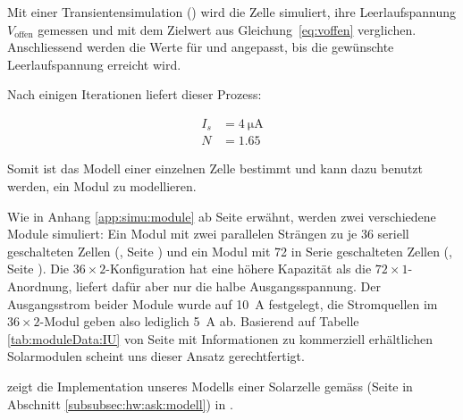 Mit einer  Transientensimulation () wird die  Zelle simuliert,
ihre  Leerlaufspannung  $V_{\mathrm{offen}}$  gemessen und  mit  dem  Zielwert
aus   Gleichung~\ref{eq:voffen}  verglichen.  Anschliessend  werden die  Werte f\"ur   und 
angepasst, bis die gew\"unschte Leerlaufspannung erreicht wird.

Nach einigen Iterationen liefert dieser Prozess\footnotemark:


\begin{align}
    \label{eq:cell:diode:IS:N:result}
    I_s &= \SI{4}{\micro\ampere} \\
    N   &= 1.65
\end{align}

Somit ist  das Modell  einer einzelnen  Zelle bestimmt  und kann  dazu benutzt
werden,  ein   Modul  zu  modellieren.

Wie  in   Anhang  \ref{app:simu:module}
ab  Seite   \pageref{app:simu:module}  erw\"ahnt,  werden   zwei  verschiedene
Module   simuliert: Ein   Modul  mit   zwei   parallelen   Str\"angen  zu   je
36  seriell   geschalteten  Zellen  (,
Seite  \pageref{fig:ltspice:module:cellBased:36x2})  und   ein  Modul  mit  72
in   Serie   geschalteten  Zellen   (,
Seite     \pageref{fig:ltspice:module:cellBased:72x1}). Die     $36     \times
2$-Konfiguration   hat   eine  h\"ohere   Kapazit\"at   als
die   $72  \times   1$-Anordnung,   liefert  daf\"ur   aber   nur  die   halbe
Ausgangsspannung. Der Ausgangsstrom  beider Module wurde  auf \SI{10}{\ampere}
festgelegt,  die Stromquellen  im  $36 \times  2$-Modul  geben also  lediglich
\SI{5}{\ampere}  ab. Basierend auf  Tabelle \ref{tab:moduleData:IU}  von Seite
\pageref{tab:moduleData:IU}  mit Informationen  zu kommerziell  erh\"altlichen
Solarmodulen scheint uns dieser Ansatz gerechtfertigt.

   zeigt   die  Implementation   unseres   Modells
einer     Solarzelle      gem\"ass          (Seite
\pageref{fig:circuit:solarCell} in Abschnitt \ref{subsubsec:hw:ask:modell}) in
.


